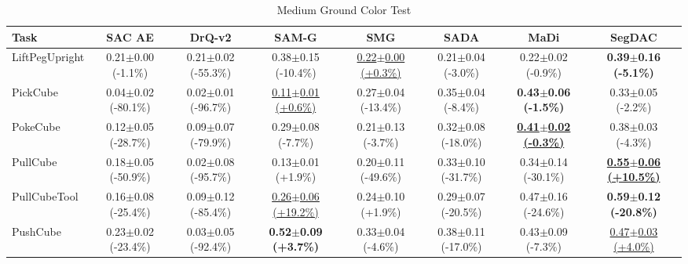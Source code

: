\begin{table}[htbp]
\centering
\scriptsize
\caption{Medium Ground Color Test}
\label{tab:appendix_groundcolortest_medium}
\begin{adjustbox}{max width=\textwidth}
\begin{tabular}{l*{7}{c}}
\toprule
\textbf{Task} & \textbf{SAC AE} & \textbf{DrQ-v2} & \textbf{SAM-G} & \textbf{SMG} & \textbf{SADA} & \textbf{MaDi} & \textbf{SegDAC} \\
\midrule
LiftPegUpright & 0.21$\pm$0.00 \scriptsize{(-1.1\%)} & 0.21$\pm$0.02 \scriptsize{(-55.3\%)} & 0.38$\pm$0.15 \scriptsize{(-10.4\%)} & \underline{0.22$\pm$0.00 \scriptsize{(+0.3\%)}} & 0.21$\pm$0.04 \scriptsize{(-3.0\%)} & 0.22$\pm$0.02 \scriptsize{(-0.9\%)} & \textbf{0.39$\pm$0.16 \scriptsize{(-5.1\%)}} \\
PickCube & 0.04$\pm$0.02 \scriptsize{(-80.1\%)} & 0.02$\pm$0.01 \scriptsize{(-96.7\%)} & \underline{0.11$\pm$0.01 \scriptsize{(+0.6\%)}} & 0.27$\pm$0.04 \scriptsize{(-13.4\%)} & 0.35$\pm$0.04 \scriptsize{(-8.4\%)} & \textbf{0.43$\pm$0.06 \scriptsize{(-1.5\%)}} & 0.33$\pm$0.05 \scriptsize{(-2.2\%)} \\
PokeCube & 0.12$\pm$0.05 \scriptsize{(-28.7\%)} & 0.09$\pm$0.07 \scriptsize{(-79.9\%)} & 0.29$\pm$0.08 \scriptsize{(-7.7\%)} & 0.21$\pm$0.13 \scriptsize{(-3.7\%)} & 0.32$\pm$0.08 \scriptsize{(-18.0\%)} & \textbf{\underline{0.41$\pm$0.02 \scriptsize{(-0.3\%)}}} & 0.38$\pm$0.03 \scriptsize{(-4.3\%)} \\
PullCube & 0.18$\pm$0.05 \scriptsize{(-50.9\%)} & 0.02$\pm$0.08 \scriptsize{(-95.7\%)} & 0.13$\pm$0.01 \scriptsize{(+1.9\%)} & 0.20$\pm$0.11 \scriptsize{(-49.6\%)} & 0.33$\pm$0.10 \scriptsize{(-31.7\%)} & 0.34$\pm$0.14 \scriptsize{(-30.1\%)} & \textbf{\underline{0.55$\pm$0.06 \scriptsize{(+10.5\%)}}} \\
PullCubeTool & 0.16$\pm$0.08 \scriptsize{(-25.4\%)} & 0.09$\pm$0.12 \scriptsize{(-85.4\%)} & \underline{0.26$\pm$0.06 \scriptsize{(+19.2\%)}} & 0.24$\pm$0.10 \scriptsize{(+1.9\%)} & 0.29$\pm$0.07 \scriptsize{(-20.5\%)} & 0.47$\pm$0.16 \scriptsize{(-24.6\%)} & \textbf{0.59$\pm$0.12 \scriptsize{(-20.8\%)}} \\
PushCube & 0.23$\pm$0.02 \scriptsize{(-23.4\%)} & 0.03$\pm$0.05 \scriptsize{(-92.4\%)} & \textbf{0.52$\pm$0.09 \scriptsize{(+3.7\%)}} & 0.33$\pm$0.04 \scriptsize{(-4.6\%)} & 0.38$\pm$0.11 \scriptsize{(-17.0\%)} & 0.43$\pm$0.09 \scriptsize{(-7.3\%)} & \underline{0.47$\pm$0.03 \scriptsize{(+4.0\%)}} \\

\end{tabular}
\end{adjustbox}
\end{table}
